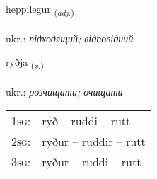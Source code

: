 \documentclass[frontgrid, backgrid]{flacards}\usepackage[]{graphicx}\usepackage[]{xcolor}
\begin{document}
\renewcommand{\flhead}{\vskip5pt \fboxsep=0pt {\small\bfseries\footnotesize Lýsingarorð | прикметник}}
\renewcommand{\fcfoot}{\vskip5pt \fboxsep=0pt \hspace{2pt}{\small\bfseries\footnotesize 3K}}

\renewcommand{\blhead}{\vskip5pt {\small\bfseries\footnotesize Lýsingarorð | прикметник }}
\renewcommand{\bcfoot}{\vskip5pt \hspace{2pt}{\small\bfseries\footnotesize 3K}}


{heppilegur \small{\textsubscript{(\textit{adj.})}} \\[1ex] %
\textphonetic{[hɛhpɪlɛɣʏr]} \\
ukr.: \emph{підходящий; відповідний} \\  [2ex]
\renewcommand*{\arraystretch}{0.8}
}

\renewcommand{\flhead}{\vskip5pt \fboxsep=0pt {\small\bfseries\footnotesize Sagnorð | дієслово}}
\renewcommand{\fcfoot}{\vskip5pt \fboxsep=0pt \hspace{2pt}{\small\bfseries\footnotesize 3K}}

\renewcommand{\blhead}{\vskip5pt {\small\bfseries\footnotesize Sagnorð | дієслово }}
\renewcommand{\bcfoot}{\vskip5pt \hspace{2pt}{\small\bfseries\footnotesize 3K}}


{ryðja \small{\textsubscript{(\textit{v.})}} \\[1ex] %
\textphonetic{[rɪðja]} \\
ukr.: \emph{розчищати; очищати} \\  [2ex]
\renewcommand*{\arraystretch}{0.8}
\begin{tabular}{p{1cm}l}
\textsc{1sg}: & ryð -- ruddi -- rutt \\ 
\textsc{2sg}: & ryður -- ruddir -- rutt \\ 
\textsc{3sg}: & ryður -- ruddi -- rutt \\ 
\end{tabular}
}
\end{document}
